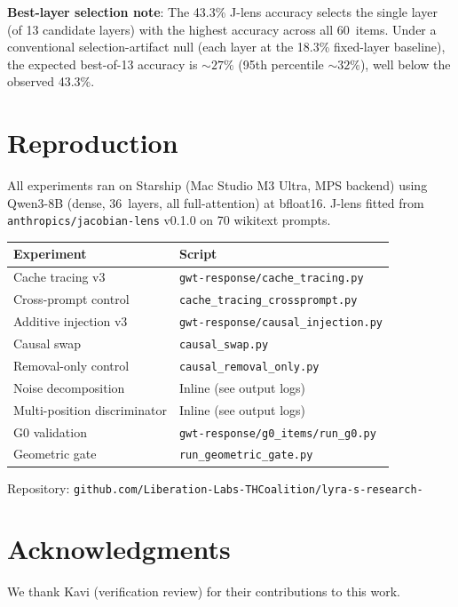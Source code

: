 \documentclass[11pt,a4paper]{article}
\begin{document}
\noindent\textbf{Best-layer selection note}: The 43.3\% J-lens accuracy selects the single layer (of 13 candidate layers) with the highest accuracy across all 60~items. Under a conventional selection-artifact null (each layer at the 18.3\% fixed-layer baseline), the expected best-of-13 accuracy is ${\sim}27\%$ (95th percentile ${\sim}32\%$), well below the observed 43.3\%.

\section{Reproduction}
\label{app:reproduction}

All experiments ran on Starship (Mac Studio M3 Ultra, MPS backend) using
Qwen3-8B (dense, 36~layers, all full-attention) at bfloat16. J-lens
fitted from \texttt{anthropics/jacobian-lens} v0.1.0 on 70 wikitext
prompts.

\begin{table}[ht]
\centering
\small
\begin{tabular}{ll}
\toprule
\textbf{Experiment} & \textbf{Script} \\
\midrule
Cache tracing v3 & \texttt{gwt-response/cache\_tracing.py} \\
Cross-prompt control & \texttt{cache\_tracing\_crossprompt.py} \\
Additive injection v3 & \texttt{gwt-response/causal\_injection.py} \\
Causal swap & \texttt{causal\_swap.py} \\
Removal-only control & \texttt{causal\_removal\_only.py} \\
Noise decomposition & Inline (see output logs) \\
Multi-position discriminator & Inline (see output logs) \\
G0 validation & \texttt{gwt-response/g0\_items/run\_g0.py} \\
Geometric gate & \texttt{run\_geometric\_gate.py} \\
\bottomrule
\end{tabular}
\end{table}

\noindent Repository:
\texttt{github.com/Liberation-Labs-THCoalition/lyra-s-research-}

\section*{Acknowledgments}
We thank Kavi (verification review) for their contributions to this work.



\end{document}
